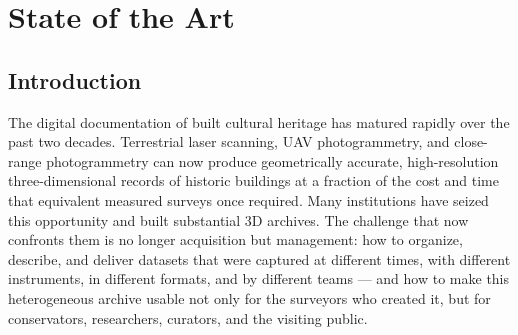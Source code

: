 \documentclass[]{report}
\begin{document}
	
	\begin{titlepage}
	    
		\thispagestyle{plain}
		\setcounter{page}{2}
		
\begin{abstract}
Lorem Ipsum
\end{abstract}




	
		
		
	\end{titlepage}

\setcounter{page}{3}

\tableofcontents
{}




	
	\newpage


\chapter{State of the Art}
\section{Introduction}
\label{sec:introduction}

The digital documentation of built cultural heritage has matured rapidly over the past two
decades. Terrestrial laser scanning, UAV photogrammetry, and close-range photogrammetry can
now produce geometrically accurate, high-resolution three-dimensional records of historic
buildings at a fraction of the cost and time that equivalent measured surveys once required.
Many institutions have seized this opportunity and built substantial 3D archives. The
challenge that now confronts them is no longer acquisition but management: how to organize,
describe, and deliver datasets that were captured at different times, with different
instruments, in different formats, and by different teams --- and how to make this
heterogeneous archive usable not only for the surveyors who created it, but for conservators,
researchers, curators, and the visiting public.
\end{document}
